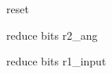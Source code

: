 
\begin{DoxyRefList}
\item[\label{todo__todo000001}%
\Hypertarget{todo__todo000001}%
File \hyperlink{cordic__sincos__engine_8vhd}{cordic\+\_\+sincos\+\_\+engine.vhd} ]reset 

reduce bits r2\+\_\+ang 

reduce bits r1\+\_\+input 
\end{DoxyRefList}